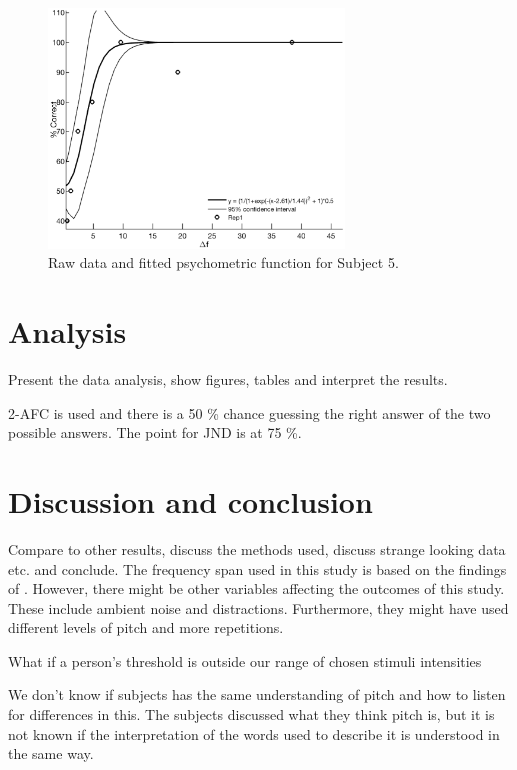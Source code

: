 \begin{figure}[H]
\centering
\includegraphics[width = 0.7\textwidth]{Figure/Vores_Figurer/Subject5} 
\caption{Raw data and fitted psychometric function for Subject 5.}
\label{fig:Subject5}
\end{figure}

\section*{Analysis}
Present the data analysis, show figures, tables and interpret the results.

2-AFC is used and there is a 50 \% chance guessing the right answer of the two possible answers. The point for JND is at 75 \%.

\section*{Discussion and conclusion} 
Compare to other results, discuss the methods used, discuss strange looking data etc. and conclude.
The frequency span used in this study is based on the findings of \citep{Wier1977}. However, there might be other variables affecting the outcomes of this study. These include ambient noise and distractions. Furthermore, they might have used different levels of pitch and more repetitions.

What if a person’s threshold is outside our range of chosen stimuli intensities 

We don’t know if subjects has the same understanding of pitch and how to listen for differences in this. The subjects discussed what they think pitch is, but it is not known if the interpretation of the words used to describe it is understood in the same way.





 
